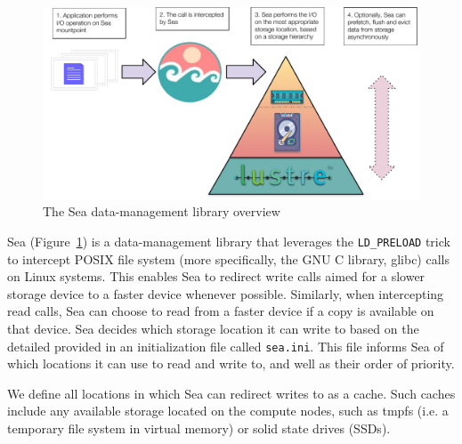 \begin{figure}

    \centering
    \includegraphics[width=\columnwidth]{figures/sea-neuro/sea-diagram.pdf}%
\caption{The Sea data-management library overview}
\label{fig:seaneuro:diagram}
\end{figure}
    Sea (Figure~\ref{fig:seaneuro:diagram}) is a data-management library that leverages the \texttt{LD\_PRELOAD}
    trick to intercept POSIX file system (more specifically, the GNU C library,
    glibc) calls on Linux systems. This enables Sea to redirect write calls
    aimed for a slower storage device to a faster device whenever possible.
    Similarly, when intercepting read calls, Sea can choose to read from a
    faster device if a copy is available on that device. Sea decides which
    storage location it can write to based on the detailed provided in an
    initialization file called \texttt{sea.ini}. This file informs Sea of which
    locations it can use to read and write to, and well as their order of
    priority.

    We define all locations in which Sea can redirect writes to as a cache. Such
    caches include any available storage located on the compute nodes, such as
    tmpfs (i.e. a temporary file system in virtual memory) or solid state drives (SSDs). 

